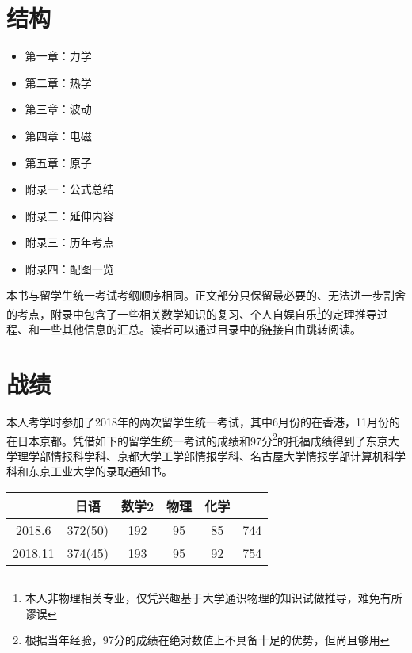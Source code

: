\section*{结构}
\begin{multicols}{2}
    \begin{itemize}
        \item 第一章：力学
        \item 第二章：热学
        \item 第三章：波动
        \item 第四章：电磁
        \item 第五章：原子
        \item 附录一：公式总结
        \item 附录二：延伸内容
        \item 附录三：历年考点
        \item 附录四：配图一览
    \end{itemize}
\end{multicols}
本书与留学生统一考试考纲顺序相同。正文部分只保留最必要的、无法进一步割舍的考点，附录中包含了一些相关数学知识的复习、个人自娱自乐\footnote{本人非物理相关专业，仅凭兴趣基于大学通识物理的知识试做推导，难免有所谬误}的定理推导过程、和一些其他信息的汇总。读者可以通过目录中的链接自由跳转阅读。

\section*{战绩}
本人考学时参加了2018年的两次留学生统一考试，其中6月份的在香港，11月份的在日本京都。凭借如下的留学生统一考试的成绩和97分\footnote{根据当年经验，97分的成绩在绝对数值上不具备十足的优势，但尚且够用}的托福成绩得到了东京大学理学部情报科学科、京都大学工学部情报学科、名古屋大学情报学部计算机科学科和东京工业大学的录取通知书。
\begin{center}
    \renewcommand\arraystretch{1.2}
    \begin{tabular}{c|cccc|c}
        \hline
        &日语&数学2&物理&化学&\\\hline
        2018.6&372(50)&192&95&85&744\\
        2018.11&374(45)&193&95&92&754\\
        \hline
    \end{tabular}
\end{center}


\clearpage
\renewcommand{\contentsname}{目录}
\tableofcontents
